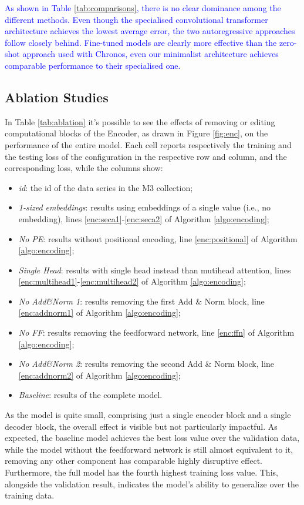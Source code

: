 \documentclass[algorithms,article,submit,pdftex,moreauthors]{Definitions/mdpi}
\begin{document}
\noindent\textcolor{blue}{As shown in Table \ref{tab:comparisons}, there is no clear dominance among the different methods. Even though the specialised convolutional transformer architecture achieves the lowest average error, the two autoregressive approaches follow closely behind. Fine-tuned models are clearly more effective than the zero-shot approach used with Chronos, even our minimalist architecture achieves comparable performance to their specialised one.}
{\color{blue}
\subsection{Ablation Studies}

In Table \ref{tab:ablation} it's possible to see the effects of removing or editing computational blocks of the Encoder, as drawn in Figure \ref{fig:enc}, on the performance of the entire model. Each cell reports respectively the training and the testing loss of the configuration in the respective row and column, and the corresponding loss, while the columns show:

\begin{itemize}
	\item {\it id}: the id of the data series in the M3 collection;
	\item {\it 1-sized embeddings}: results using embeddings of a single value (i.e., no embedding), lines \ref{enc:seca1}-\ref{enc:seca2} of Algorithm \ref{algo:encoding};
	\item {\it No PE}: results without positional encoding, line \ref{enc:positional} of Algorithm \ref{algo:encoding};
	\item {\it Single Head}: results with single head instead than mutihead attention, lines \ref{enc:multihead1}-\ref{enc:multihead2} of Algorithm \ref{algo:encoding}; 
	\item {\it No Add\&Norm 1}: results removing the first Add \& Norm block, line \ref{enc:addnorm1} of Algorithm \ref{algo:encoding};
	\item {\it No FF}: results removing the feedforward network, line \ref{enc:ffn} of Algorithm \ref{algo:encoding};
	\item {\it No Add\&Norm 2}: results removing the second Add \& Norm block, line \ref{enc:addnorm2} of Algorithm \ref{algo:encoding};
	\item {\it Baseline}: results of the complete model.
\end{itemize}

As the model is quite small, comprising just a single encoder block and a single decoder block, the overall effect is visible but not particularly impactful. As expected, the baseline model achieves the best loss value over the validation data, while the model without the feedforward network is still almost equivalent to it, removing any other component has comparable highly disruptive effect. Furthermore, the full model has the fourth highest training loss value. This, alongside the validation result, indicates the model's ability to generalize over the training data.

}
\end{document}
